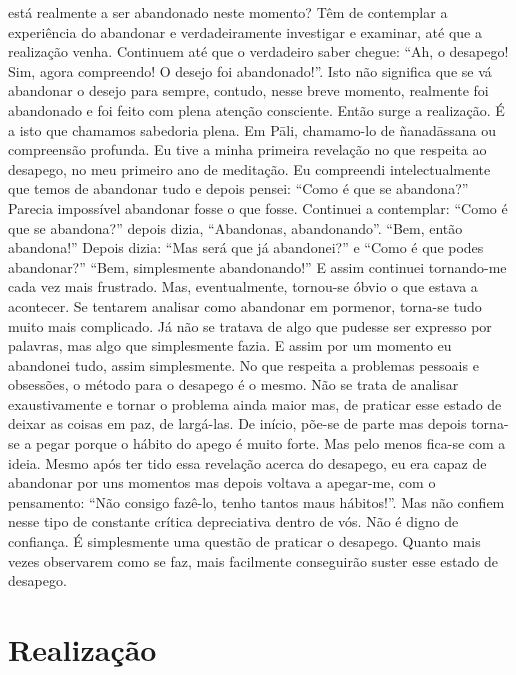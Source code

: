 está realmente a ser abandonado neste momento? Têm de
contemplar a experiência do abandonar e verdadeiramente
investigar e examinar, até que a realização venha. Continuem
até que o verdadeiro saber chegue: “Ah, o desapego! Sim,
agora compreendo! O desejo foi abandonado!”. Isto não
significa que se vá abandonar o desejo para sempre, contudo,
nesse breve momento, realmente foi abandonado e foi feito
com plena atenção consciente. Então surge a realização. É a
isto que chamamos sabedoria plena. Em Pāli, chamamo-lo de
ñanadāssana ou compreensão profunda.
Eu tive a minha primeira revelação no que respeita ao
desapego, no meu primeiro ano de meditação. Eu compreendi
intelectualmente que temos de abandonar tudo e depois pensei:
“Como é que se abandona?” Parecia impossível abandonar
fosse o que fosse. Continuei a contemplar: “Como é que se
abandona?” depois dizia, “Abandonas, abandonando”. “Bem,
então abandona!” Depois dizia: “Mas será que já abandonei?”
e “Como é que podes abandonar?” “Bem, simplesmente
abandonando!” E assim continuei tornando-me cada vez mais
frustrado. Mas, eventualmente, tornou-se óbvio o que estava
a acontecer. Se tentarem analisar como abandonar em pormenor, torna-se tudo muito mais complicado. Já não se tratava de algo que pudesse ser expresso por palavras, mas algo
que simplesmente fazia. E assim por um momento eu abandonei tudo, assim simplesmente.
No que respeita a problemas pessoais e obsessões, o
método para o desapego é o mesmo. Não se trata de analisar
exaustivamente e tornar o problema ainda maior mas, de
praticar esse estado de deixar as coisas em paz, de largá-las.
De início, põe-se de parte mas depois torna-se a pegar porque
o hábito do apego é muito forte. Mas pelo menos fica-se com
a ideia. Mesmo após ter tido essa revelação acerca do
desapego, eu era capaz de abandonar por uns momentos mas
depois voltava a apegar-me, com o pensamento: “Não consigo
fazê-lo, tenho tantos maus hábitos!”.
Mas não confiem nesse tipo de constante crítica depreciativa dentro de vós. Não é digno de confiança. É simplesmente uma questão de praticar o desapego. Quanto mais
vezes observarem como se faz, mais facilmente conseguirão
suster esse estado de desapego.

\section{Realização}


